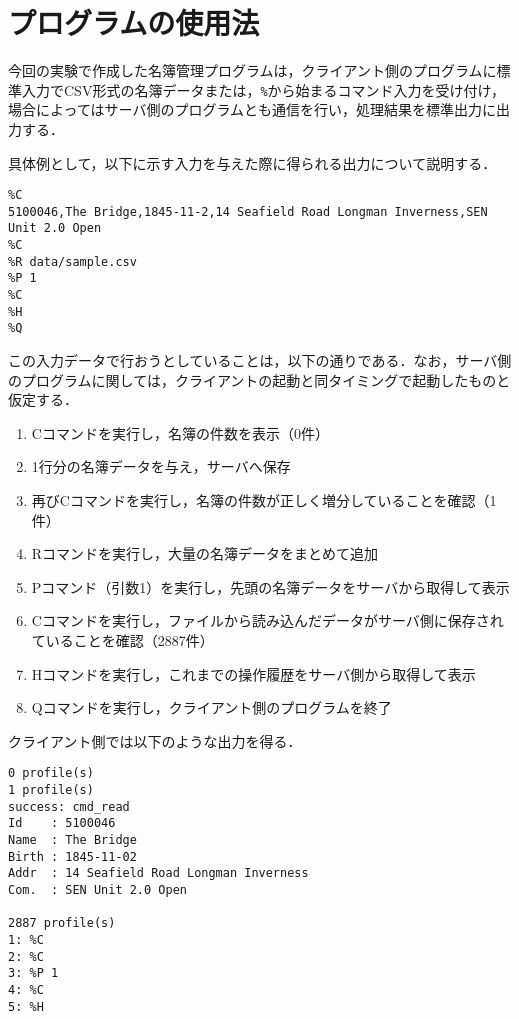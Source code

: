 \documentclass[11pt]{jsarticle}
\begin{document}
\section{プログラムの使用法}

今回の実験で作成した名簿管理プログラムは，クライアント側のプログラムに標準入力でCSV形式の名簿データまたは，{\tt \%}から始まるコマンド入力を受け付け，場合によってはサーバ側のプログラムとも通信を行い，処理結果を標準出力に出力する．

具体例として，以下に示す入力を与えた際に得られる出力について説明する．

{\small
\begin{verbatim}
%C
5100046,The Bridge,1845-11-2,14 Seafield Road Longman Inverness,SEN Unit 2.0 Open
%C
%R data/sample.csv
%P 1
%C
%H
%Q
\end{verbatim}
}

この入力データで行おうとしていることは，以下の通りである．なお，サーバ側のプログラムに関しては，クライアントの起動と同タイミングで起動したものと仮定する．

\begin{enumerate}
      \item Cコマンドを実行し，名簿の件数を表示（0件）
      \item 1行分の名簿データを与え，サーバへ保存
      \item 再びCコマンドを実行し，名簿の件数が正しく増分していることを確認（1件）
      \item Rコマンドを実行し，大量の名簿データをまとめて追加
      \item Pコマンド（引数1）を実行し，先頭の名簿データをサーバから取得して表示
      \item Cコマンドを実行し，ファイルから読み込んだデータがサーバ側に保存されていることを確認（2887件）
      \item Hコマンドを実行し，これまでの操作履歴をサーバ側から取得して表示
      \item Qコマンドを実行し，クライアント側のプログラムを終了
\end{enumerate}

クライアント側では以下のような出力を得る．

\begin{verbatim}
0 profile(s)
1 profile(s)
success: cmd_read
Id    : 5100046
Name  : The Bridge
Birth : 1845-11-02
Addr  : 14 Seafield Road Longman Inverness
Com.  : SEN Unit 2.0 Open

2887 profile(s)
1: %C
2: %C
3: %P 1
4: %C
5: %H
\end{verbatim}
\end{document}
